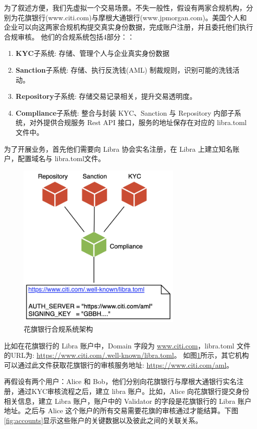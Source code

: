 为了叙述方便，我们先虚拟一个交易场景。不失一般性，假设有两家合规机构，分别为花旗银行(www.citi.com)与摩根大通银行(www.jpmorgan.com)。美国个人和企业可以向这两家合规机构提交真实身份数据，完成账户注册，并且委托他们执行合规审核。
他们的合规系统包括4部分：：
\begin{enumerate}
    \item \textbf{KYC}子系统:      存储、管理个人与企业真实身份数据
    \item \textbf{Sanction}子系统: 存储、执行反洗钱(AML) 制裁规则，识别可能的洗钱活动。
    \item \textbf{Repository}子系统: 存储交易记录相关，提升交易透明度。
    \item \textbf{Compliance}子系统: 整合与封装 KYC、Sanction 与 Repository 内部子系统，对外提供合规服务 Rest API 接口，服务的地址保存在对应的 libra.toml 文件中。
\end{enumerate}

为了开展业务，首先他们需要向 Libra 协会实名注册，在 Libra 上建立知名账户，配置域名与 libra.toml文件。

\begin{figure}[h!]
    \centering
    \includegraphics[width=8cm, keepaspectratio]{images/citi.png}
    \caption{花旗银行合规系统架构}
    \label{fig:citi}
\end{figure}


比如在花旗银行的 Libra 账户中，Domain 字段为 \url{www.citi.com}，libra.toml 文件的URL为: \url{https://www.citi.com/.well-known/libra.toml}。
如图\ref{fig:citi}所示，其它机构可以通过此文件获取花旗银行的审核服务地址: \url{https://www.citi.com/aml}。

再假设有两个用户：Alice 和 Bob，他们分别向花旗银行与摩根大通银行实名注册，通过KYC审核流程之后，建立 libra 账户。比如，Alice 向花旗银行提交身份相关信息，建立 Libra 账户，账户中的 Validator 的字段是花旗银行的 Libra 账户地址。之后与 Alice 这个账户的所有交易需要花旗的审核通过才能结算。下图\ref{fig:accounts}显示这些账户的关键数据以及彼此之间的关联关系。

